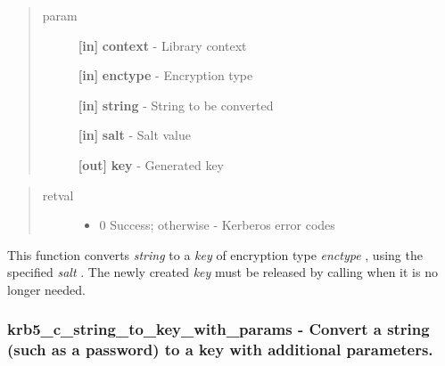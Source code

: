 \documentclass[letterpaper,10pt,english]{sphinxmanual}
\begin{document}
\begin{quote}\begin{description}
\item[{param}] \leavevmode
\textbf{{[}in{]}} \textbf{context} - Library context

\textbf{{[}in{]}} \textbf{enctype} - Encryption type

\textbf{{[}in{]}} \textbf{string} - String to be converted

\textbf{{[}in{]}} \textbf{salt} - Salt value

\textbf{{[}out{]}} \textbf{key} - Generated key

\end{description}\end{quote}
\begin{quote}\begin{description}
\item[{retval}] \leavevmode\begin{itemize}
\item {} 
0   Success; otherwise - Kerberos error codes

\end{itemize}

\end{description}\end{quote}

This function converts \emph{string} to a \emph{key} of encryption type \emph{enctype} , using the specified \emph{salt} . The newly created \emph{key} must be released by calling {\hyperref[appdev/refs/api/krb5_free_keyblock_contents:c.krb5_free_keyblock_contents]{}} when it is no longer needed.


\subsubsection{krb5\_c\_string\_to\_key\_with\_params -  Convert a string (such as a password) to a key with additional parameters.}
\label{appdev/refs/api/krb5_c_string_to_key_with_params::doc}\label{appdev/refs/api/krb5_c_string_to_key_with_params:krb5-c-string-to-key-with-params-convert-a-string-such-as-a-password-to-a-key-with-additional-parameters}

\begin{fulllineitems}
\label{appdev/refs/api/krb5_c_string_to_key_with_params:c.krb5_c_string_to_key_with_params}
\end{fulllineitems}
\end{document}

